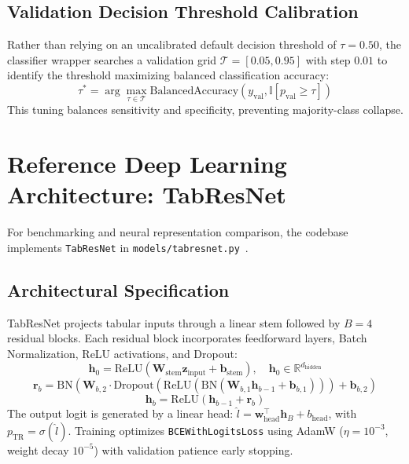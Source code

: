 \documentclass[11pt,a4paper]{report}
\begin{document}
\subsection{Validation Decision Threshold Calibration}
Rather than relying on an uncalibrated default decision threshold of $\tau = 0.50$, the classifier wrapper searches a validation grid $\mathcal{T} = [0.05, 0.95]$ with step $0.01$ to identify the threshold maximizing balanced classification accuracy:
\begin{equation}
  \tau^* = \arg\max_{\tau \in \mathcal{T}} \text{BalancedAccuracy}\left(y_{\text{val}}, \mathbb{I}[p_{\text{val}} \ge \tau]\right)
\end{equation}
This tuning balances sensitivity and specificity, preventing majority-class collapse.

\section{Reference Deep Learning Architecture: TabResNet}
For benchmarking and neural representation comparison, the codebase implements \texttt{TabResNet} in \texttt{models/tabresnet.py}~\cite{gorishniy2021revisiting}.

\subsection{Architectural Specification}
TabResNet projects tabular inputs through a linear stem followed by $B=4$ residual blocks. Each residual block incorporates feedforward layers, Batch Normalization, ReLU activations, and Dropout:
\begin{equation}
  \mathbf{h}_0 = \text{ReLU}\left(\mathbf{W}_{\text{stem}} \mathbf{z}_{\text{input}} + \mathbf{b}_{\text{stem}}\right), \quad \mathbf{h}_0 \in \mathbb{R}^{d_{\text{hidden}}}
\end{equation}
\begin{equation}
  \mathbf{r}_b = \text{BN}\left(\mathbf{W}_{b,2} \cdot \text{Dropout}\left(\text{ReLU}\left(\text{BN}\left(\mathbf{W}_{b,1} \mathbf{h}_{b-1} + \mathbf{b}_{b,1}\right)\right)\right) + \mathbf{b}_{b,2}\right)
\end{equation}
\begin{equation}
  \mathbf{h}_b = \text{ReLU}\left(\mathbf{h}_{b-1} + \mathbf{r}_b\right)
\end{equation}
The output logit is generated by a linear head: $\hat{l} = \mathbf{w}_{\text{head}}^\top \mathbf{h}_B + b_{\text{head}}$, with $p_{\text{TR}} = \sigma(\hat{l})$. Training optimizes \texttt{BCEWithLogitsLoss} using AdamW ($\eta=10^{-3}$, weight decay $10^{-5}$) with validation patience early stopping.
\end{document}
